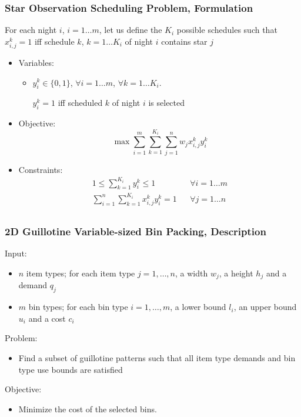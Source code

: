 \documentclass[10pt]{beamer}
\begin{document}
\begin{frame}
  \frametitle{Star Observation Scheduling Problem, Formulation}

  For each night $i$, $i = 1 \dots m$, let us define the $K_i$ possible schedules such that $x_{i, j}^k = 1$ iff schedule $k$, $k = 1 \dots K_i$ of night $i$ contains star $j$

  \begin{itemize}
    \item Variables:
      \begin{itemize}
        \item $y_i^k \in \{0, 1\}$,
          $\forall i = 1 \dots m$, $\forall k = 1 \dots K_i$.

          $y_i^k = 1$ iff scheduled $k$ of night $i$ is selected
      \end{itemize}

    \item Objective:
      \begin{displaymath}
        \max \sum_{i = 1}^m \sum_{k = 1}^{K_i} \sum_{j = 1}^n w_j x_{i, j}^k y_i^k
      \end{displaymath}

    \item Constraints:
      \begin{align*}
        1 \le \sum_{k = 1}^{K_i} y_i^k \le 1 && \forall i = 1 \dots m \\
        \sum_{i = 1}^n \sum_{k = 1}^{K_i} x_{i, j}^k y_i^k = 1 && \forall j = 1 \dots n \\
      \end{align*}
  \end{itemize}
\end{frame}

\begin{frame}
  \frametitle{2D Guillotine Variable-sized Bin Packing, Description}

  Input:
  \begin{itemize}
    \item $n$ item types; for each item type $j = 1, \dots, n$, a width \alert{$w_j$}, a height \alert{$h_j$} and a demand \alert{$q_j$}
    \item $m$ bin types; for each bin type $i = 1, \dots, m$, a lower bound \alert{$l_i$}, an upper bound \alert{$u_i$} and a cost \alert{$c_i$}
  \end{itemize}

  Problem:
  \begin{itemize}
    \item Find a subset of guillotine patterns such that all item type demands and bin type use bounds are satisfied
  \end{itemize}

  Objective:
  \begin{itemize}
    \item Minimize the cost of the selected bins.
  \end{itemize}
\end{frame}
\end{document}
